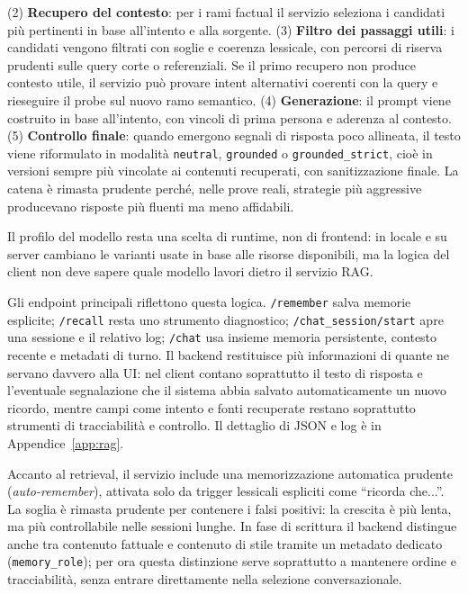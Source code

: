 (2) \textbf{Recupero del contesto}: per i rami factual il servizio seleziona i candidati più pertinenti in base all'intento e alla sorgente. (3) \textbf{Filtro dei passaggi utili}: i candidati vengono filtrati con soglie e coerenza lessicale, con percorsi di riserva prudenti sulle query corte o referenziali. Se il primo recupero non produce contesto utile, il servizio può provare intent alternativi coerenti con la query e rieseguire il probe sul nuovo ramo semantico. (4) \textbf{Generazione}: il prompt viene costruito in base all'intento, con vincoli di prima persona e aderenza al contesto. (5) \textbf{Controllo finale}: quando emergono segnali di risposta poco allineata, il testo viene riformulato in modalità \texttt{neutral}, \texttt{grounded} o \texttt{grounded\_strict}, cioè in versioni sempre più vincolate ai contenuti recuperati, con sanitizzazione finale. La catena è rimasta prudente perché, nelle prove reali, strategie più aggressive producevano risposte più fluenti ma meno affidabili.

Il profilo del modello resta una scelta di runtime, non di frontend: in locale e su server cambiano le varianti usate in base alle risorse disponibili, ma la logica del client non deve sapere quale modello lavori dietro il servizio RAG.

Gli endpoint principali riflettono questa logica. \texttt{/remember} salva memorie esplicite; \texttt{/recall} resta uno strumento diagnostico; \texttt{/chat\_session/start} apre una sessione e il relativo log; \texttt{/chat} usa insieme memoria persistente, contesto recente e metadati di turno. Il backend restituisce più informazioni di quante ne servano davvero alla UI: nel client contano soprattutto il testo di risposta e l'eventuale segnalazione che il sistema abbia salvato automaticamente un nuovo ricordo, mentre campi come intento e fonti recuperate restano soprattutto strumenti di tracciabilità e controllo. Il dettaglio di JSON e log è in Appendice~\ref{app:rag}.

Accanto al retrieval, il servizio include una memorizzazione automatica prudente (\emph{auto-remember}), attivata solo da trigger lessicali espliciti come ``ricorda che...''. La soglia è rimasta prudente per contenere i falsi positivi: la crescita è più lenta, ma più controllabile nelle sessioni lunghe. In fase di scrittura il backend distingue anche tra contenuto fattuale e contenuto di stile tramite un metadato dedicato (\texttt{memory\_role}); per ora questa distinzione serve soprattutto a mantenere ordine e tracciabilità, senza entrare direttamente nella selezione conversazionale.

